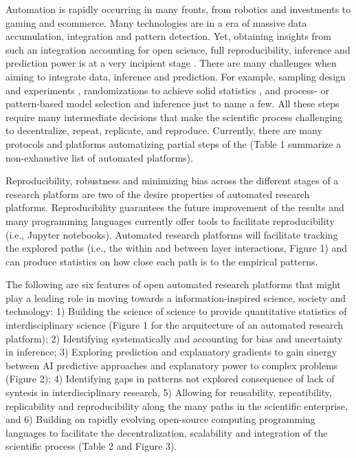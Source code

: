 \documentclass[english,12pt]{article}
\begin{document}
Automation is rapidly occurring in many fronts, from robotics and
investments to gaming and ecommerce. Many technologies are in a era of
massive data accumulation, integration and pattern detection. Yet,
obtaining insights from such an integration accounting for open
science, full reproducibility, inference and prediction power is at a
very incipient stage \citep{Ioannidis2005,Reichsteietal2019}. There
are many challenges when aiming to integrate data, inference and
prediction. For example, sampling design and experiments  \citep{Voelkl2018}, randomizations to achieve solid
statistics , and process- or pattern-based
model selection and inference  just to name a
few. All these steps require many intermediate decisions that make the
scientific process challenging to decentralize, repeat, replicate, and
reproduce. Currently, there are many protocols and platforms
automatizing partial steps of the  (Table 1
summarize a non-exhaustive list of automated platforms).

Reproducibility, robustness and minimizing bias across the different
stages of a research platform are two of the desire properties of
automated research platforms. Reproducibility guarantees the future
improvement of the results and many programming languages currently
offer tools to facilitate reproducibility (i.e., Jupyter
notebooks). Automated research platforms will facilitate tracking the
explored paths (i.e., the within and between layer interactions,
Figure 1) and can produce statistics on how close each path is to the
empirical patterns.

The following are six features of open automated research platforms
 that might play a leading
role in moving towards a information-inspired science, society and
technology: 1) Building the science of science to provide quantitative
statistics
of interdisciplinary science (Figure 1 for the arquitecture of an
automated research platform); 2) Identifying systematically and
accounting for bias and uncertainty in inference; 3) Exploring
prediction and explanatory gradients to gain sinergy between AI
predictive approaches and explanatory power to complex problems
(Figure 2); 4) Identifying gaps in patterns not explored consequence
of lack of syntesis in interdisciplinary research, 5) Allowing for
reusability, repeatibility, replicability and reproducibility along
the many paths in the scientific enterprise, and 6) Building on
rapidly evolving open-source computing programming languages to
facilitate the decentralization, scalability and integration of the
scientific process (Table 2 and Figure 3).
\end{document}
